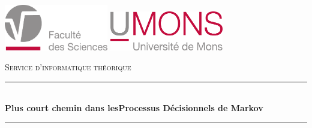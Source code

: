 \documentclass[12pt,a4paper]{report}
\theoremstyle{definition}%
\theoremstyle{remark}
\begin{document}
\begin{titlepage}

	\newcommand{\HRule}{\rule{\linewidth}{0.5mm}} %

	\center %


	\begin{center}
	\includegraphics[height=2cm]{logos/UMONS_FS.pdf}
	\hspace{5cm}
	\includegraphics[height=1.7cm]{logos/UMONS+txt}
	\\[1em]
	\vspace{1cm}
	\end{center}
	\textsc{\large Service d'informatique théorique }\\[0.5cm] %


	\vspace{0.5cm}
	\HRule \\[0.4cm]
	{\huge \bfseries \centering \quad Plus court chemin dans les\newline \newline Processus Décisionnels  de Markov}\\[0.4cm] %
	\HRule \\[1cm]


\end{titlepage}
\end{document}
